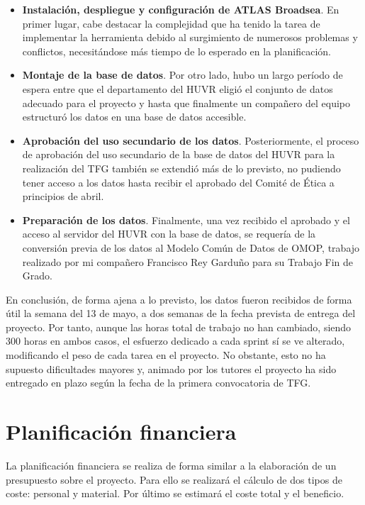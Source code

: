 \begin{itemize}
    \item \textbf{Instalación, despliegue y configuración de ATLAS Broadsea}. En primer lugar, cabe destacar la complejidad que ha tenido la tarea de implementar la herramienta debido al surgimiento de numerosos problemas y conflictos, necesitándose más tiempo de lo esperado en la planificación.
    \item \textbf{Montaje de la base de datos}. Por otro lado, hubo un largo período de espera entre que el departamento del HUVR eligió el conjunto de datos adecuado para el proyecto y hasta que finalmente un compañero del equipo estructuró los datos en una base de datos accesible.
    \item \textbf{Aprobación del uso secundario de los datos}. Posteriormente, el proceso de aprobación del uso secundario de la base de datos del HUVR para la realización del TFG también se extendió más de lo previsto, no pudiendo tener acceso a los datos hasta recibir el aprobado del Comité de Ética a principios de abril.
    \item \textbf{Preparación de los datos}. Finalmente, una vez recibido el aprobado y el acceso al servidor del HUVR con la base de datos, se requería de la conversión previa de los datos al Modelo Común de Datos de OMOP, trabajo realizado por mi compañero Francisco Rey Garduño para su Trabajo Fin de Grado. 
    
\end{itemize}

En conclusión, de forma ajena a lo previsto, los datos fueron recibidos de forma útil la semana del 13 de mayo, a dos semanas de la fecha prevista de entrega del proyecto. Por tanto, aunque las horas total de trabajo no han cambiado, siendo 300 horas en ambos casos,  el esfuerzo dedicado a cada sprint sí se ve alterado, modificando el peso de cada tarea en el proyecto. No obstante, esto no ha supuesto dificultades mayores y, animado por los tutores el proyecto ha sido entregado en plazo según la fecha de la primera convocatoria de TFG.


\section{Planificación financiera} \label{sec:03Costes}

La planificación financiera se realiza de forma similar a la elaboración de un presupuesto sobre el proyecto. Para ello se realizará el cálculo de dos tipos de coste: personal y material. Por último se estimará el coste total y el beneficio.

